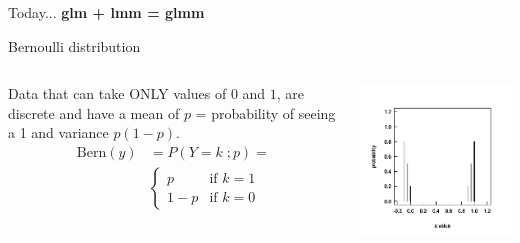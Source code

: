 \documentclass{beamer}
\begin{document}
\begin{frame}{Today...}
    \center\huge\textbf{glm + lmm = glmm}
\end{frame}

\begin{frame}{Bernoulli distribution}
    \begin{columns}
        \begin{column}{0.5\textwidth}
        Data that can take ONLY values of $0$ and $1$, are discrete and have a mean of $p$ = probability of seeing a 1 and variance $p(1 - p)$. 
            \begin{align*}
            \text{Bern}(y) &= P(Y = k\; ; p) = \\
            &\begin{cases} 
            p & \text{if } k = 1 \\ 
            1 - p & \text{if } k = 0 
            \end{cases}
            \end{align*}
        \end{column}
        \begin{column}{0.5\textwidth}
         \includegraphics[width=\textwidth]{lectures/day_10_GLMMs/figures/unnamed-chunk-2-1.png} %
        \end{column}
    \end{columns}
\end{frame}
\end{document}
